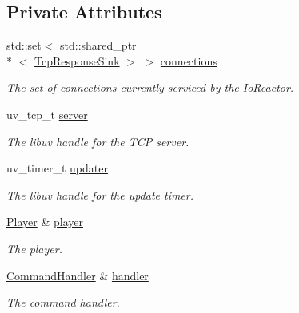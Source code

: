 \subsection*{Private Attributes}
\begin{DoxyCompactItemize}
\item 
\hypertarget{classIoReactor_a15617cf44d3c50d5c2d31e8b1812e140}{std\+::set$<$ std\+::shared\+\_\+ptr\\*
$<$ \hyperlink{classTcpResponseSink}{Tcp\+Response\+Sink} $>$ $>$ \hyperlink{classIoReactor_a15617cf44d3c50d5c2d31e8b1812e140}{connections}}\label{classIoReactor_a15617cf44d3c50d5c2d31e8b1812e140}

\begin{DoxyCompactList}\small\item\em The set of connections currently serviced by the \hyperlink{classIoReactor}{Io\+Reactor}. \end{DoxyCompactList}\item 
\hypertarget{classIoReactor_a4c9c61af246fda7db1bdd4e2b3170c66}{uv\+\_\+tcp\+\_\+t \hyperlink{classIoReactor_a4c9c61af246fda7db1bdd4e2b3170c66}{server}}\label{classIoReactor_a4c9c61af246fda7db1bdd4e2b3170c66}

\begin{DoxyCompactList}\small\item\em The libuv handle for the T\+C\+P server. \end{DoxyCompactList}\item 
\hypertarget{classIoReactor_a6364acb721e4a7a1374070e317074bbc}{uv\+\_\+timer\+\_\+t \hyperlink{classIoReactor_a6364acb721e4a7a1374070e317074bbc}{updater}}\label{classIoReactor_a6364acb721e4a7a1374070e317074bbc}

\begin{DoxyCompactList}\small\item\em The libuv handle for the update timer. \end{DoxyCompactList}\item 
\hypertarget{classIoReactor_a795397b36da55b59bff63b455a344dea}{\hyperlink{classPlayer}{Player} \& \hyperlink{classIoReactor_a795397b36da55b59bff63b455a344dea}{player}}\label{classIoReactor_a795397b36da55b59bff63b455a344dea}

\begin{DoxyCompactList}\small\item\em The player. \end{DoxyCompactList}\item 
\hypertarget{classIoReactor_a81bf838edb7adf1edcb992bfe61d6b78}{\hyperlink{classCommandHandler}{Command\+Handler} \& \hyperlink{classIoReactor_a81bf838edb7adf1edcb992bfe61d6b78}{handler}}\label{classIoReactor_a81bf838edb7adf1edcb992bfe61d6b78}

\begin{DoxyCompactList}\small\item\em The command handler. \end{DoxyCompactList}\end{DoxyCompactItemize}
